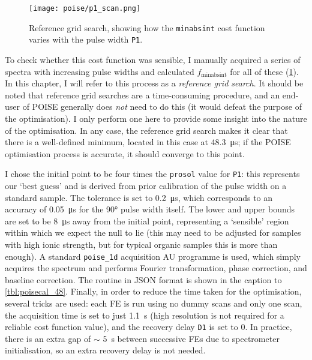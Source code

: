 \begin{figure}[htb]
    \centering
    \texttt{[image: poise/p1\_scan.png]}%
    \caption[Reference grid search for pulse width optimisation]{
        Reference grid search, showing how the \texttt{minabsint} cost function varies with the pulse width \texttt{P1}.
    }
    \label{fig:p1_scan}
\end{figure}

To check whether this cost function was sensible, I manually acquired a series of spectra with increasing pulse widths and calculated $f_\text{minabsint}$ for all of these (\cref{fig:p1_scan}).
In this chapter, I will refer to this process as a \textit{reference grid search}.
It should be noted that reference grid searches are a time-consuming procedure, and an end-user of POISE generally does \textit{not} need to do this (it would defeat the purpose of the optimisation).
I only perform one here to provide some insight into the nature of the optimisation.
In any case, the reference grid search makes it clear that there is a well-defined minimum, located in this case at \qty{48.3}{\us}; if the POISE optimisation process is accurate, it should converge to this point.

I chose the initial point to be four times the \texttt{prosol} value for \texttt{P1}: this represents our `best guess' and is derived from prior calibration of the pulse width on a standard sample.
The tolerance is set to \qty{0.2}{\us}, which corresponds to an accuracy of \qty{0.05}{\us} for the \ang{90} pulse width itself.
The lower and upper bounds are set to be \qty{8}{\us} away from the initial point, representing a `sensible' region within which we expect the null to lie (this may need to be adjusted for samples with high ionic strength, but for typical organic samples this is more than enough).
A standard \texttt{poise\_1d} acquisition AU programme is used, which simply acquires the spectrum and performs Fourier transformation, phase correction, and baseline correction.
The routine in JSON format is shown in the caption to \cref{tbl:poisecal_48}.
Finally, in order to reduce the time taken for the optimisation, several tricks are used: each FE is run using no dummy scans and only one scan, the acquisition time is set to just \qty{1.1}{\s} (high resolution is not required for a reliable cost function value), and the recovery delay \texttt{D1} is set to 0.
In practice, there is an extra gap of $\sim$ \qty{5}{\s} between successive FEs due to spectrometer initialisation, so an extra recovery delay is not needed.


